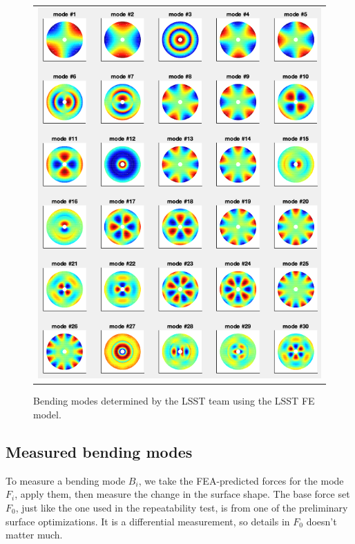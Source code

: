 \documentclass [twoside,openbib,12pt]{article}
\begin{document}
 \begin{figure}[bthp]
   \begin{center}
   \begin{tabular}{c}
\includegraphics[width=140mm]{figures/feaBM.png}
  \end{tabular}
   \end{center}
   \caption
  { \label{fig:feaBM}
Bending modes determined by the LSST team using the LSST FE model.
 }
\end{figure}

\subsection{Measured bending modes}

To measure a bending mode $B_i$, we take the FEA-predicted forces for the
mode $F_i$, apply them, then measure the change in the surface shape.
The base force set $F_0$, just like the one used in the repeatability
test, is from one of the preliminary surface optimizations. It is a
differential measurement, so details in $F_0$ doesn't matter much.
\end{document}
